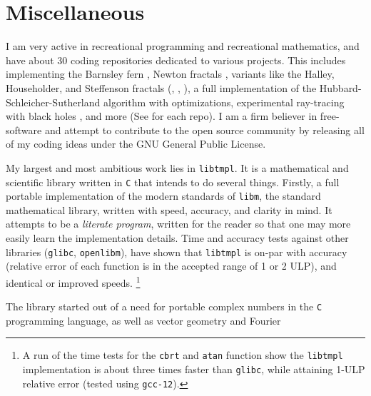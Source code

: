 \documentclass{article}
\theoremstyle{plain}
\begin{document}
    \section{Miscellaneous}
        I am very active in recreational programming and recreational
        mathematics, and have about 30 coding repositories dedicated to various
        projects. This includes implementing the Barnsley fern
        \cite{MaguireBarnsleyFern}, Newton fractals
        \cite{MaguireNewtonFractals}, variants like the
        Halley, Householder, and Steffenson fractals
        (\cite{MaguireHalleyFractals},
        \cite{MaguireHouseholderFractals},
        \cite{MaguireSteffensonFractals}), a full
        implementation of the Hubbard-Schleicher-Sutherland algorithm
        \cite{HSSAlgorithm2001} with optimizations, experimental ray-tracing
        with black holes \cite{MaguireNewtonianBlackHoles}, and more
        (See \cite{MaguireGitHub} for each repo). I am a firm believer in
        free-software and attempt to contribute to the open source community
        by releasing all of my coding ideas under the GNU General Public
        License.
        \par\hfill\par
        My largest and most ambitious work lies in \texttt{libtmpl}. It is a
        mathematical and scientific library written in \texttt{C} that intends
        to do several things. Firstly, a full portable implementation of the
        modern standards of \texttt{libm}, the standard mathematical library,
        written with speed, accuracy, and clarity in mind. It attempts to be a
        \textit{literate program}, written for the reader so that one may
        more easily learn the implementation details. Time and accuracy tests
        against other libraries (\texttt{glibc}, \texttt{openlibm}), have
        shown that \texttt{libtmpl} is on-par with accuracy (relative error
        of each function is in the accepted range of 1 or 2 ULP), and identical
        or improved speeds.%
        \footnote{%
            A run of the time tests for the \texttt{cbrt} and \texttt{atan}
            function show the \texttt{libtmpl} implementation is about three
            times faster than \texttt{glibc}, while attaining 1-ULP relative
            error (tested using \texttt{gcc-12}).
        }
        \par\hfill\par
        The library started out of a need for portable complex numbers in the
        \texttt{C} programming language, as well as vector geometry and Fourier
\end{document}
